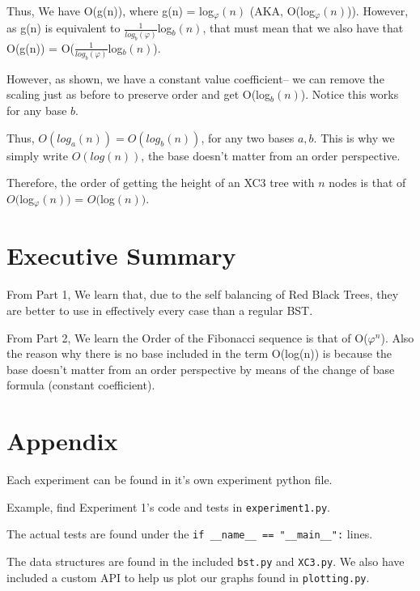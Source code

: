 \documentclass{article}
\begin{document}
Thus, We have O(g(n)), where g(n) = log$_{\varphi}(n)$ (AKA, O(log$_{\varphi}(n)$)). However, as g(n) is equivalent to $\frac{1}{log_{b}(\varphi)}$log$_{b}(n)$, that must mean that we also have that O(g(n)) = O($\frac{1}{log_{b}(\varphi)}$log$_{b}(n)$).

However, as shown, we have a constant value coefficient-- we can remove the scaling just as before to preserve order and get O(log$_{b}(n)$). Notice this works for any base $b$.

Thus, $O(log_{a}(n)) = O(log_{b}(n))$, for any two bases $a, b$. This is why we simply write $O(log(n))$, the base doesn't matter from an order perspective.

Therefore, the order of getting the height of an XC3 tree with $n$ nodes is that of $O($log$_{\varphi}(n))$ = $O($log$(n))$.


\section{Executive Summary}

From Part 1, We learn that, due to the self balancing of Red Black Trees, they are better to use in effectively every case than a regular BST.

From Part 2, We learn the Order of the Fibonacci sequence is that of O($\varphi^{n}$). Also the reason why there is no base included in the term O(log(n)) is because the base doesn't matter from an order perspective by means of the change of base formula (constant coefficient).


\newpage
\section{Appendix}

Each experiment can be found in it's own experiment python file. 

Example, find Experiment 1's code and tests in \verb|experiment1.py|.

The actual tests are found under the \verb|if __name__ == "__main__":| lines.

The data structures are found in the included \verb|bst.py| and \verb|XC3.py|. We also have included a custom API to help us plot our graphs found in \verb|plotting.py|.
\end{document}
